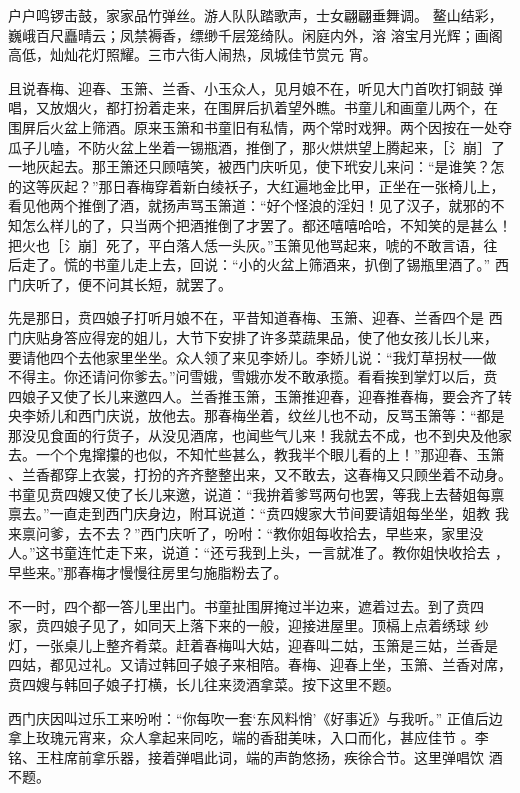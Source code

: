 户户鸣锣击鼓，家家品竹弹丝。游人队队踏歌声，士女翩翩垂舞调。
鳌山结彩，巍峨百尺矗晴云；凤禁褥香，缥缈千层笼绮队。闲庭内外，溶
溶宝月光辉；画阁高低，灿灿花灯照耀。三市六街人闹热，凤城佳节赏元
宵。

且说春梅、迎春、玉箫、兰香、小玉众人，见月娘不在，听见大门首吹打铜鼓
弹唱，又放烟火，都打扮着走来，在围屏后扒着望外瞧。书童儿和画童儿两个，在
围屏后火盆上筛酒。原来玉箫和书童旧有私情，两个常时戏狎。两个因按在一处夺
瓜子儿嗑，不防火盆上坐着一锡瓶酒，推倒了，那火烘烘望上腾起来，［氵崩］了
一地灰起去。那王箫还只顾嘻笑，被西门庆听见，使下玳安儿来问：“是谁笑？怎
的这等灰起？”那日春梅穿着新白绫袄子，大红遍地金比甲，正坐在一张椅儿上，
看见他两个推倒了酒，就扬声骂玉箫道：“好个怪浪的淫妇！见了汉子，就邪的不
知怎么样儿的了，只当两个把酒推倒了才罢了。都还嘻嘻哈哈，不知笑的是甚么！
把火也［氵崩］死了，平白落人恁一头灰。”玉箫见他骂起来，唬的不敢言语，往
后走了。慌的书童儿走上去，回说：“小的火盆上筛酒来，扒倒了锡瓶里酒了。”
西门庆听了，便不问其长短，就罢了。

先是那日，贲四娘子打听月娘不在，平昔知道春梅、玉箫、迎春、兰香四个是
西门庆贴身答应得宠的姐儿，大节下安排了许多菜蔬果品，使了他女孩儿长儿来，
要请他四个去他家里坐坐。众人领了来见李娇儿。李娇儿说：“我灯草拐杖──做
不得主。你还请问你爹去。”问雪娥，雪娥亦发不敢承揽。看看挨到掌灯以后，贲
四娘子又使了长儿来邀四人。兰香推玉箫，玉箫推迎春，迎春推春梅，要会齐了转
央李娇儿和西门庆说，放他去。那春梅坐着，纹丝儿也不动，反骂玉箫等：“都是
那没见食面的行货子，从没见酒席，也闻些气儿来！我就去不成，也不到央及他家
去。一个个鬼撺攥的也似，不知忙些甚么，教我半个眼儿看的上！”那迎春、玉箫
、兰香都穿上衣裳，打扮的齐齐整整出来，又不敢去，这春梅又只顾坐着不动身。
书童见贲四嫂又使了长儿来邀，说道：“我拚着爹骂两句也罢，等我上去替姐每禀
禀去。”一直走到西门庆身边，附耳说道：“贲四嫂家大节间要请姐每坐坐，姐教
我来禀问爹，去不去？”西门庆听了，吩咐：“教你姐每收拾去，早些来，家里没
人。”这书童连忙走下来，说道：“还亏我到上头，一言就准了。教你姐快收拾去
，早些来。”那春梅才慢慢往房里匀施脂粉去了。

不一时，四个都一答儿里出门。书童扯围屏掩过半边来，遮着过去。到了贲四
家，贲四娘子见了，如同天上落下来的一般，迎接进屋里。顶槅上点着绣球
纱灯，一张桌儿上整齐肴菜。赶着春梅叫大姑，迎春叫二姑，玉箫是三姑，兰香是
四姑，都见过礼。又请过韩回子娘子来相陪。春梅、迎春上坐，玉箫、兰香对席，
贲四嫂与韩回子娘子打横，长儿往来烫酒拿菜。按下这里不题。

西门庆因叫过乐工来吩咐：“你每吹一套‘东风料悄’《好事近》与我听。”
正值后边拿上玫瑰元宵来，众人拿起来同吃，端的香甜美味，入口而化，甚应佳节
。李铭、王柱席前拿乐器，接着弹唱此词，端的声韵悠扬，疾徐合节。这里弹唱饮
酒不题。

